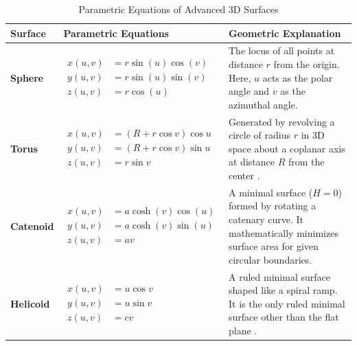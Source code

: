 \documentclass[12pt, a4paper]{report}
\begin{document}
\begin{table}[htbp]
    \centering
    \renewcommand{\arraystretch}{1.8}
    \caption{Parametric Equations of Advanced 3D Surfaces}
    \label{tab:3d_param}
    \begin{tabular}{@{} l p{4.5cm} p{6.5cm} @{}}
        \toprule
        \textbf{Surface} & \textbf{Parametric Equations} & \textbf{Geometric Explanation} \\
        \midrule
        \textbf{Sphere} & $\begin{aligned} x(u,v) &= r \sin(u) \cos(v) \\ y(u,v) &= r \sin(u) \sin(v) \\ z(u,v) &= r \cos(u) \end{aligned}$ & The locus of all points at distance $r$ from the origin. Here, $u$ acts as the polar angle and $v$ as the azimuthal angle. \\
        
        \textbf{Torus} & $\begin{aligned} x(u,v) &= (R + r \cos v) \cos u \\ y(u,v) &= (R + r \cos v) \sin u \\ z(u,v) &= r \sin v \end{aligned}$ & Generated by revolving a circle of radius $r$ in 3D space about a coplanar axis at distance $R$ from the center \cite{kobayashi2019}. \\
        
        \textbf{Catenoid} & $\begin{aligned} x(u,v) &= a \cosh(v) \cos(u) \\ y(u,v) &= a \cosh(v) \sin(u) \\ z(u,v) &= a v \end{aligned}$ & A minimal surface ($H=0$) formed by rotating a catenary curve. It mathematically minimizes surface area for given circular boundaries. \\
        
        \textbf{Helicoid} & $\begin{aligned} x(u,v) &= u \cos v \\ y(u,v) &= u \sin v \\ z(u,v) &= c v \end{aligned}$ & A ruled minimal surface shaped like a spiral ramp. It is the only ruled minimal surface other than the flat plane \cite{kobayashi2019}. \\
        \bottomrule
    \end{tabular}
\end{table}
\end{document}

